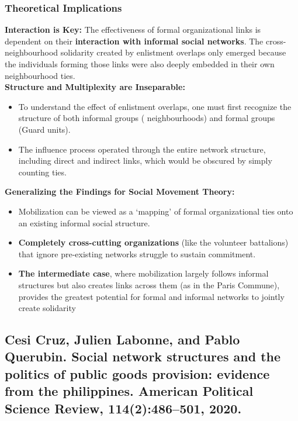 \documentclass{article}
\begin{document}
    \subsubsection{Theoretical Implications}

    \noindent \textbf{Interaction is Key:} The effectiveness of formal
organizational links is dependent on their
\textbf{interaction with informal social networks}. The cross-neighbourhood
solidarity created by enlistment overlaps only emerged because the
individuals forming those links were also deeply embedded in their own
neighbourhood ties.\\

    \noindent \textbf{Structure and Multiplexity are Inseparable:}
    \begin{itemize}
        \item To understand the effect of enlistment overlaps, one must
        first recognize the structure of both informal groups (
        neighbourhoods) and formal groups (Guard units).
        \item The influence process operated through the entire network
        structure, including direct and indirect links, which would be
        obscured by simply counting ties.
    \end{itemize}

    \noindent \textbf{Generalizing the Findings for Social Movement Theory:}
    \begin{itemize}
        \item Mobilization can be viewed as a `mapping' of formal
        organizational ties onto an existing informal social structure.
        \item
        \textbf{Completely cross-cutting organizations} (like the volunteer battalions) that ignore pre-existing networks struggle to sustain commitment.
        \item \textbf{The intermediate case}, where mobilization largely
        follows informal structures but also creates links across them (as
        in the Paris Commune), provides the greatest potential for formal
        and informal networks to jointly create solidarity
    \end{itemize}

    \subsection{Cesi Cruz, Julien Labonne, and Pablo Querubin. Social network structures and the politics of public goods provision: evidence from the philippines. American Political Science Review, 114(2):486–501, 2020.}
\end{document}
